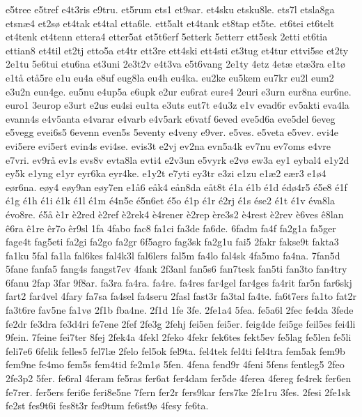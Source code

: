 e5tree
e5tref
e4t3ris
e9tru.
et5rum
ets1
et9sar.
et4sku
etsku8le.
ets7l
etsla8ga
etsn^^e64
et2s^^f8
et4tak
et4tal
etta6le.
ett5alt
et4tank
et8tap
et5te.
et6tei
et6telt
et4tenk
et4tenn
ettera4
etter5at
et5t6erf
5etterk
5etterr
ett5esk
2etti
et6tia
ettian8
et4til
et2tj
etto5a
et4tr
ett3re
ett4ski
ett4sti
et3tug
et4tur
ettvi5se
et2ty
2e1tu
5e6tui
etu6na
et3uni
2e3t2v
e4t3va
e5t6vang
2e1ty
4etz
4et^^e6
et^^e63ra
e1t^^f8
e1t^^e5
et^^e55re
e1u
eu4a
e8uf
eug8la
eu4h
eu4ka.
eu2ke
eu5kem
eu7kr
eu2l
eum2
e3u2n
eun4ge.
eu5nu
e4up5a
e6upk
e2ur
eu6rat
eure4
2euri
e3urn
eur8na
eur6ne.
euro1
3europ
e3urt
e2us
eu4si
eu1ta
e3uts
eut7t
e4u3z
e1v
evad6r
ev5akti
eva4la
evann4s
e4v5anta
e4varar
e4varb
e4v5ark
e6vatf
6eved
eve5d6a
eve5del
6eveg
e5vegg
evei6s5
6evenn
even5s
5eventy
e4veny
e9ver.
e5ves.
e5veta
e5vev.
evi4e
evi5ere
evi5ert
evin4s
evi4se.
evis3t
e2vj
ev2na
evn5a4k
ev7nu
ev7oms
e4vre
e7vri.
ev9r^^e5
ev1s
evs8v
evta8la
evti4
e2v3un
e5vyrk
e2v^^f8
ew3a
ey1
eybal4
e1y2d
ey5k
e1yng
e1yr
eyr6ka
eyr4ke.
e1y2t
e7yti
ey3tr
e3zi
e1zu
e1^^e62
e^^e6r3
e1^^f84
e^^f8r6na.
e^^f8y4
e^^f8y9an
e^^f8y7en
e1^^e56
e^^e5k4
e^^e5n8da
e^^e5t8t
^^e91a
^^e91b
^^e91d
^^e9d^^f84r5
^^e95e8
^^e91f
^^e91g
^^e91h
^^e91i
^^e91k
^^e91l
^^e91m
^^e94n5e
^^e95n6et
^^e95o
^^e91p
^^e91r
^^e92rj
^^e91s
^^e9se2
^^e91t
^^e91v
^^e9va8la
^^e9vo8re.
^^e95^^e5
^^e81r
^^e82red
^^e82ref
^^e82rek4
^^e84rener
^^e82rep
^^e8re3s2
^^e84rest
^^e82rev
^^e86ves
^^ea8lan
^^ea6ra
^^ea1re
^^ear7o
^^ear9sl
1fa
4fabo
fac8
fa1ci
fa3de
fa6de.
6fadm
fa4f
fa2g1a
fa5ger
fage4t
fag5eti
fa2gi
fa2go
fa2gr
6f5agro
fag3sk
fa2g1u
fai5
2fakr
fakse9t
fakta3
fa1ku
5fal
fa1la
fal6kes
fal4k3l
fal6lers
fal5m
fa4lo
fal4sk
4fa5mo
fa4na.
7fan5d
5fane
fanfa5
fang4s
fangst7ev
4fank
2f3anl
fan5s6
fan7tesk
fan5ti
fan3to
fan4try
6fanu
2fap
3far
9f8ar.
fa3ra
fa4ra.
fa4re.
fa4res
far4gel
far4ges
fa4rit
far5n
far6skj
fart2
far4vel
4fary
fa7sa
fa4sel
fa4seru
2fasl
fast3r
fa3tal
fa4te.
fa6t7ers
fa1to
fat2r
fa3t6re
fav5ne
fa1v^^f8
2f1b
fba4ne.
2f1d
1fe
3fe.
2fe1a4
5fea.
fe5a6l
2fec
fe4da
3fede
fe2dr
fe3dra
fe3d4ri
fe7ene
2fef
2fe3g
2fehj
fei5en
fei5er.
feig4de
fei5ge
feil5es
fei4li
9fein.
7feine
fei7ter
8fej
2fek4a
4fekl
2feko
4fekr
fek6tes
fekt5ev
fe5lag
fe5len
fe5li
feli7e6
6felik
felles5
fel7l^^e6
2felo
fel5ok
fel9ta.
fel4tek
fel4ti
fel4tra
fem5ak
fem9b
fem9ne
fe4mo
fem5s
fem4tid
fe2m1^^f8
5fen.
4fena
fend9r
4feni
5fens
fentleg5
2feo
2fe3p2
5fer.
fe6ral
4feram
fe5ras
fer6at
fer4dam
fer5de
4ferea
4fereg
fe4rek
fer6en
fe7rer.
fer5ers
feri6e
feri8e5ne
7fern
fer2r
fers9kar
fers7ke
2fe1ru
3fes.
2fesi
2fe1sk
fe2st
fes9t6i
fes8t3r
fes9tum
fe6st9^^f8
4fesy
fe6ta.
